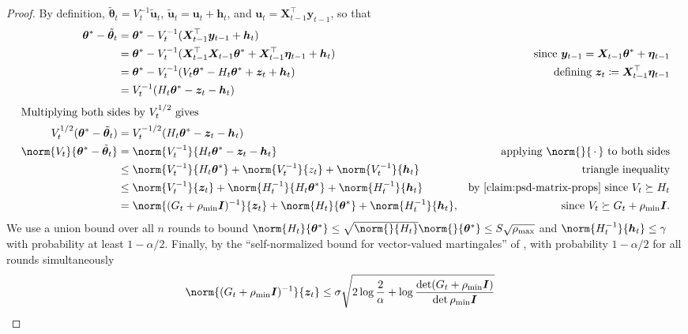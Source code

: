 \documentclass{article}
\renewcommand{\vec}[1]{\bm{#1}}
\newcommand{\wildcard}{\mathinner{\,{\cdot}\,}}
\newcommand{\defeq}{\coloneq}
\newcommand{\inv}[1]{#1^{-1}}
\renewcommand{\det}{\operatorname{det}}
\providecommand\transp{\top}
\let\transpsymbol\transp
\renewcommand{\transp}[1]{#1^\transpsymbol}
\newcommand{\Eye}[1][]{\bm{I}\notblank{#1}{_{{#1}\times{#1}}}{}}
\newcommand{\XtX}[1]{\transp{#1}{#1}}
\begin{document}
\begin{proof}
  By definition, $\tilde{\vec\theta}_t = \inv{V_t} \tilde{\vec u}_t$,
  $\tilde{\vec u}_t = \vec u_t + \vec h_t$, and $\vec u_t = \transp{\vec
    X_{t-1}} \vec y_{t-1}$, so that
  \begin{align*}
    \vec\theta^* - \tilde{\vec\theta}_t
    &= \vec\theta^* - \inv{V_t}(\transp{\vec X_{t-1}} \vec y_{t-1} + \vec h_t) \\
    &= \vec\theta^* - \inv{V_t}(\XtX{\vec X_{t-1}} \vec\theta^*
      + \transp{\vec X_{t-1}} \vec\eta_{t-1} + \vec h_t)
    &\text{since } \vec y_{t-1} = \vec X_{t-1} \vec\theta^* + \vec\eta_{t-1} \\
    &= \vec\theta^* - \inv{V_t}(V_t \vec\theta^* - H_t \vec\theta^* + \vec z_t + \vec h_t)
    &\text{defining } \vec z_t \defeq \transp{\vec X_{t-1}} \vec\eta_{t-1} \\
    &= \inv{V_t}(H_t\vec\theta^* - \vec z_t - \vec h_t) \\
    \shortintertext{Multiplying both sides by $V_t^{1/2}$ gives}
    V_t^{1/2}(\vec\theta^* - \tilde{\vec\theta}_t)
    &= V_t^{-1/2}(H_t\vec\theta^* - \vec z_t - \vec h_t) \\
    \norm{V_t}{\vec\theta^* - \tilde{\vec\theta}_t}
    &= \norm{\inv{V_t}}{H_t\vec\theta^* - \vec z_t - \vec h_t}
    &\text{applying $\norm{}{\wildcard}$ to both sides}\\
    &\le \norm{\inv{V_t}}{H_t\vec\theta^*} + \norm{\inv{V_t}}{z_t}
      + \norm{\inv{V_t}}{\vec h_t} &\text{triangle inequality} \\
    &\le \norm{\inv{V_t}}{\vec z_t} + \norm{\inv{H_t}}{H_t\vec\theta^*}
      + \norm{\inv{H_t}}{\vec h_t}
    &\text{by \cref{claim:psd-matrix-props} since } V_t \succeq H_t \\
    &= \norm{\inv{(G_t+\rho_{\min}\Eye)}}{\vec z_t} + \norm{H_t}{\vec\theta^*} +
      \norm{\inv{H_t}}{\vec h_t},
    &\text{since } V_t \succeq G_t + \rho_{\min}\Eye.
  \end{align*}
  We use a union bound over all $n$ rounds to bound
  $\norm{H_t}{\vec\theta^*} \le
  \sqrt{\norm{}{H_t}}\norm{}{\vec\theta^*} \le S\sqrt{\rho_{\max}}$
  and $\norm{\inv{H_t}}{\vec h_t} \le \gamma$ with probability at
  least $1-\alpha/2$.  Finally, by the ``self-normalized bound for
  vector-valued martingales'' of
  \citet[Theorem~1]{AbbasiYadkoriImprovedAlgorithmsLinear2011}, with
  probability $1-\alpha/2$ for all rounds simultaneously
  \begin{align*}
    \norm{\inv{(G_t + \rho_{\min}\Eye)}}{\vec z_t}
    &\le \sigma\sqrt{2\log\frac{2}{\alpha} + \log\frac{\det(G_t+\rho_{\min}\Eye)}{\det\rho_{\min}\Eye}}

\end{align*}
\end{proof}
\end{document}
